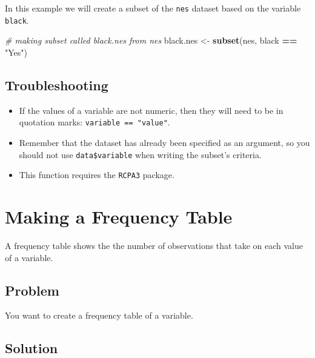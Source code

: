 \documentclass[
]{book}
\newenvironment{Shaded}{\begin{snugshade}}{\end{snugshade}}
\newcommand{\CommentTok}[1]{\textcolor[rgb]{0.56,0.35,0.01}{\textit{#1}}}
\newcommand{\FunctionTok}[1]{\textcolor[rgb]{0.13,0.29,0.53}{\textbf{#1}}}
\newcommand{\NormalTok}[1]{#1}
\newcommand{\OtherTok}[1]{\textcolor[rgb]{0.56,0.35,0.01}{#1}}
\newcommand{\SpecialCharTok}[1]{\textcolor[rgb]{0.81,0.36,0.00}{\textbf{#1}}}
\newcommand{\StringTok}[1]{\textcolor[rgb]{0.31,0.60,0.02}{#1}}
\begin{document}
In this example we will create a subset of the \texttt{nes} dataset based on the variable \texttt{black}.

\begin{Shaded}
\begin{Highlighting}[]
\CommentTok{\# making subset called \textquotesingle{}black.nes\textquotesingle{} from \textquotesingle{}nes\textquotesingle{}}
\NormalTok{black.nes }\OtherTok{\textless{}{-}} \FunctionTok{subset}\NormalTok{(nes, black }\SpecialCharTok{==} \StringTok{"Yes"}\NormalTok{)}
\end{Highlighting}
\end{Shaded}

\hypertarget{troubleshooting-25}{%
\subsection{Troubleshooting}\label{troubleshooting-25}}

\begin{itemize}
\item
  If the values of a variable are not numeric, then they will need to be in quotation marks: \texttt{variable\ ==\ "value"}.
\item
  Remember that the dataset has already been specified as an argument, so you should not use \texttt{data\$variable} when writing the subset's criteria.
\item
  This function requires the \texttt{RCPA3} package.
\end{itemize}

\hypertarget{frequency}{%
\section{Making a Frequency Table}\label{frequency}}

A frequency table shows the the number of observations that take on each value of a variable.

\hypertarget{problem-30}{%
\subsection{Problem}\label{problem-30}}

You want to create a frequency table of a variable.

\hypertarget{solution-29}{%
\subsection{Solution}\label{solution-29}}
\end{document}
